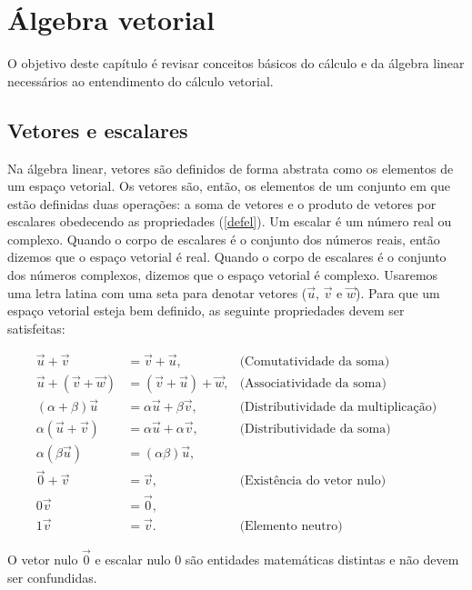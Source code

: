 
\chapter{Álgebra vetorial}
O objetivo deste capítulo é revisar conceitos básicos do cálculo e da álgebra linear necessários ao entendimento do cálculo vetorial.    


\section{Vetores e escalares}
Na álgebra linear, vetores são definidos de forma abstrata como os elementos de um espaço vetorial. Os vetores são, então, os elementos de um conjunto em que estão definidas duas operações: a soma de vetores e o produto de vetores por escalares obedecendo as propriedades (\ref{defel}). Um escalar é um número real ou complexo. Quando o corpo de escalares é o conjunto dos números reais, então dizemos que o espaço vetorial é real. Quando o corpo de escalares é o conjunto dos números complexos, dizemos que o espaço vetorial é complexo. Usaremos uma letra latina com uma seta para denotar vetores ($\vec{u}$, $\vec{v}$ e $\vec{w}$).  Para que um espaço vetorial esteja bem definido, as seguinte propriedades devem ser satisfeitas:

\begin{subequations}\label{defel}
\begin{align}
\vec{u}+\vec{v}&=\vec{v}+\vec{u},&\text{(Comutatividade da soma)}\label{defelcom}\\
\vec{u}+\left(\vec{v}+\vec{w}\right)&=\left(\vec{v}+\vec{u}\right)+\vec{w},&\text{(Associatividade da soma)}\label{defelass}\\
\left(\alpha+\beta\right) \vec{u}&=\alpha\vec{u}+\beta\vec{v},&\text{(Distributividade da multiplicação)}\label{defeldist1}\\
\alpha \left(\vec{u}+\vec{v}\right)&= \alpha \vec{u}+\alpha\vec{v},&\text{(Distributividade da soma)}\label{defeldist2}\\
\alpha \left(\beta\vec{u}\right)&=\left(\alpha\beta\right)\vec{u},\label{defeldist3}\\
\vec{0}+\vec{v}&=\vec{v}, &\text{(Existência do vetor nulo)}\label{defelnulo}\\
0\vec{v}&=\vec{0},\label{defelnulo2}\\
1\vec{v}&=\vec{v}.&\text{(Elemento neutro)}\label{defelneutro}
\end{align}
\end{subequations}
\begin{obs} O vetor nulo $\vec{0}$ e escalar nulo $0$ são entidades matemáticas distintas e não devem ser confundidas.\end{obs}

